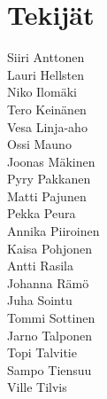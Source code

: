 \chapter{Tekijät}

Siiri Anttonen \\
Lauri Hellsten\\
Niko Ilomäki\\
Tero Keinänen\\
Vesa Linja-aho\\
Ossi Mauno\\
Joonas Mäkinen\\
Pyry Pakkanen\\
Matti Pajunen\\
Pekka Peura\\
Annika Piiroinen\\
Kaisa Pohjonen\\
Antti Rasila\\
Johanna Rämö\\
Juha Sointu\\
Tommi Sottinen\\
Jarno Talponen\\
Topi Talvitie\\
Sampo Tiensuu\\
Ville Tilvis

